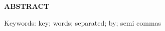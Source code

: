 \thispagestyle{empty}
\begin{center}
\textbf{\MakeUppercase{Abstract}}
\end{center}

\begin{spacing}{1}
\lipsum[6]
\end{spacing}

\vspace{1em}

Keywords: key; words; separated; by; semi commas
\newpage